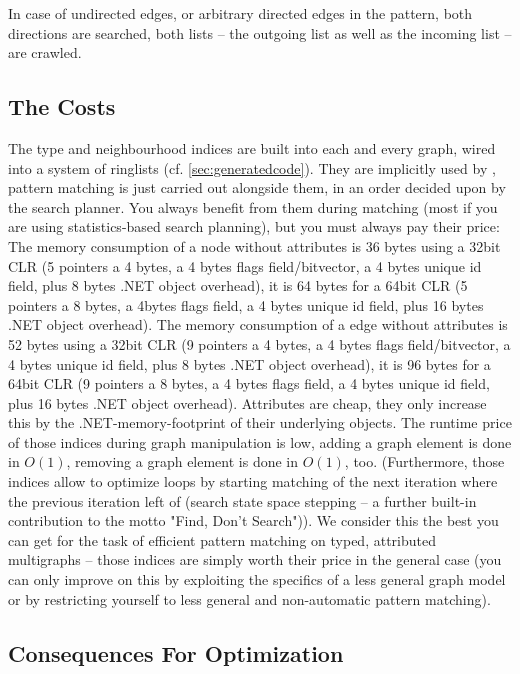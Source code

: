 In case of undirected edges, or arbitrary directed edges in the pattern, both directions are searched,
both lists -- the outgoing list as well as the incoming list -- are crawled.

\subsection{The Costs}\label{sec:performancememory} 
The type and neighbourhood indices are built into each and every \GrG{} graph, wired into a system of ringlists (cf. \ref{sec:generatedcode}).
They are implicitly used by \GrG{}, pattern matching is just carried out alongside them, in an order decided upon by the search planner. 
You always benefit from them during matching (most if you are using statistics-based search planning), but you must always pay their price:
The memory consumption of a \GrG{} node without attributes is 36 bytes using a 32bit CLR (5 pointers a 4 bytes, a 4 bytes flags field/bitvector, a 4 bytes unique id field, plus 8 bytes .NET object overhead), it is 64 bytes for a 64bit CLR (5 pointers a 8 bytes, a 4bytes flags field, a 4 bytes unique id field, plus 16 bytes .NET object overhead).
The memory consumption of a \GrG{} edge without attributes is 52 bytes using a 32bit CLR (9 pointers a 4 bytes, a 4 bytes flags field/bitvector, a 4 bytes unique id field, plus 8 bytes .NET object overhead), it is 96 bytes for a 64bit CLR (9 pointers a 8 bytes, a 4 bytes flags field, a 4 bytes unique id field, plus 16 bytes .NET object overhead).
Attributes are cheap, they only increase this by the .NET-memory-footprint of their underlying objects.
The runtime price of those indices during graph manipulation is low, adding a graph element is done in $O(1)$, removing a graph element is done in $O(1)$, too. 
(Furthermore, those indices allow to optimize loops by starting matching of the next iteration where the previous iteration left of (search state space stepping -- a further built-in contribution to the motto "Find, Don't Search")).
We consider this the best you can get for the task of efficient pattern matching on typed, attributed multigraphs -- those indices are simply worth their price in the general case (you can only improve on this by exploiting the specifics of a less general graph model or by restricting yourself to less general and non-automatic pattern matching).

\subsection{Consequences For Optimization}

